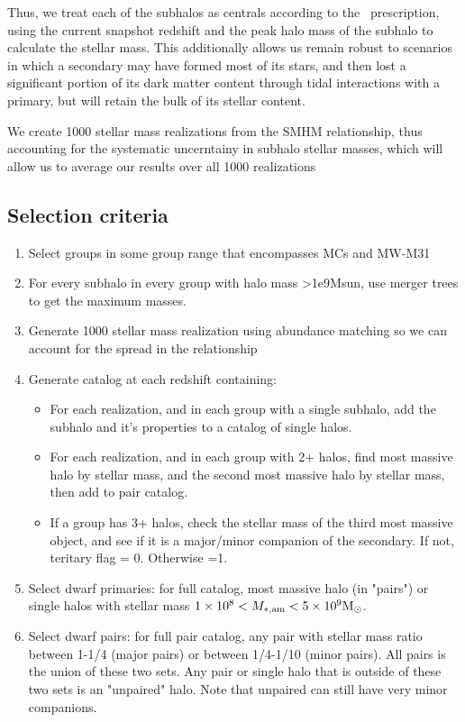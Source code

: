 \documentclass[twocolumn]{aastex631}
\begin{document}
Thus, we treat each of the subhalos as centrals according to the~\citet{moster13} prescription, using the current snapshot redshift and the peak halo mass of the subhalo to calculate the stellar mass. 
This additionally allows us remain robust to scenarios in which a secondary may have formed most of its stars, and then lost a significant portion of its dark matter content through tidal interactions with a primary, but will retain the bulk of its stellar content.

We create 1000 stellar mass realizations from the SMHM relationship, thus accounting for the systematic uncerntainy in subhalo stellar masses, which will allow us to average our results over all 1000 realizations 

\subsection{Selection criteria}\label{sec:methods-crit}
\begin{enumerate}
  \item Select groups in some group range that encompasses MCs and MW-M31
  \item For every subhalo in every group with halo mass >1e9Msun, use merger trees to get the maximum masses.
  \item Generate 1000 stellar mass realization using abundance matching so we can account for the spread in the relationship
  \item Generate catalog at each redshift containing: 
  \begin{itemize}
    \item For each realization, and in each group with a single subhalo, add the subhalo and it's properties to a catalog of single halos.
    \item For each realization, and in each group with 2+ halos, find most massive halo by stellar mass, and the second most massive halo by stellar mass, then add to pair catalog. 
    \item If a group has 3+ halos, check the stellar mass of the third most massive object, and see if it is a major/minor companion of the secondary. If not, teritary flag = 0. Otherwise =1.
  \end{itemize}
  \item Select dwarf primaries: for full catalog, most massive halo (in "pairs") or single halos with stellar mass $1\times10^{8} < M_{*,\mathrm{am}} < 5\times10^{9} \mathrm{M}_\odot$. 
  \item Select dwarf pairs: for full pair catalog, any pair with stellar mass ratio between 1-1/4 (major pairs) or between 1/4-1/10 (minor pairs). All pairs is the union of these two sets. Any pair or single halo that is outside of these two sets is an "unpaired" halo. Note that unpaired can still have very minor companions. 
\end{enumerate}
\end{document}
